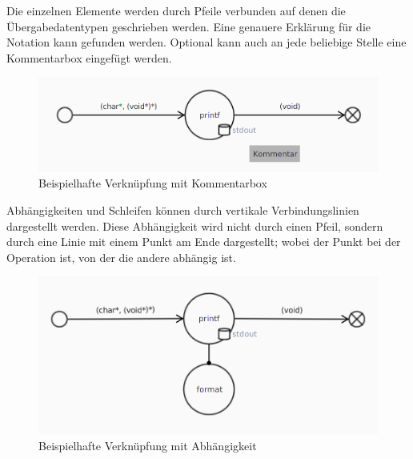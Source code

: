 Die einzelnen Elemente werden durch Pfeile verbunden auf denen die Übergabedatentypen geschrieben werden. Eine genauere
Erklärung für die Notation kann  gefunden werden. Optional kann auch an jede beliebige Stelle
eine Kommentarbox eingefügt werden.
\begin{figure}[H]
	\centering
	\includegraphics[width=\maxwidth{.9\textwidth}]{Element_connected_comment.png}
	\caption{Beispielhafte Verknüpfung mit Kommentarbox}
\end{figure}

Abhängigkeiten und Schleifen können durch vertikale Verbindungslinien dargestellt werden. Diese Abhängigkeit wird nicht durch einen
Pfeil, sondern durch eine Linie mit einem Punkt am Ende dargestellt; wobei der Punkt bei der Operation ist, von der die andere
abhängig ist.
\begin{figure}[H]
	\centering
	\includegraphics[width=\maxwidth{.9\textwidth}]{Element_connected_dep.png}
	\caption{Beispielhafte Verknüpfung mit Abhängigkeit}
\end{figure}

\subsubsection{\textFlowNotation}
\label{\textFlowNotation}